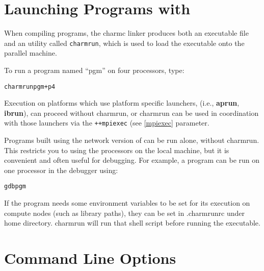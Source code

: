 \section{Launching Programs with }
\label{charmrun}

When compiling \charmpp{} programs, the charmc linker produces 
both an executable file and an utility called {\tt charmrun},
which is used to load the executable onto the parallel machine.

To run a \charmpp{} program named ``pgm'' on four processors, type:
\begin{alltt}
charmrun pgm +p4
\end{alltt}

Execution on platforms which use platform specific launchers, (i.e.,
{\bf aprun}, {\bf ibrun}), can proceed without charmrun, or charmrun can be used
in coordination with those launchers via the {\tt ++mpiexec} (see
\ref{mpiexec} parameter.

Programs built using the network version of \charmpp{} can be run
alone, without charmrun.  This restricts you to using the processors
on the local machine, but it is convenient and often useful for
debugging.  For example, a \charmpp{} program can be run on one
processor in the debugger using:

\begin{alltt}
gdb pgm
\end{alltt}

If the program needs some environment variables
to be set for its execution on compute nodes
(such as library paths), they can be set in
.charmrunrc under home directory. charmrun
will run that shell script before running the executable.

\section[Command Line Options]{Command Line Options}
\label{command line options}

